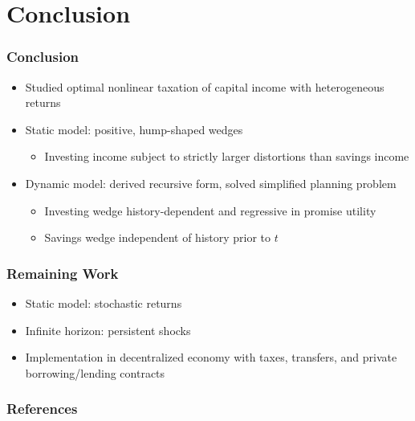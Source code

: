 \documentclass{beamer}
\begin{document}



\section{Conclusion}
\begin{frame}
    \frametitle{Conclusion}

    \begin{itemize}
        \item Studied optimal nonlinear taxation of capital income with heterogeneous returns 
        \item Static model: positive, hump-shaped wedges 
        \begin{itemize}
            \item Investing income subject to strictly larger distortions than savings income 
        \end{itemize} 
        \item Dynamic model: derived recursive form, solved simplified planning problem 
        \begin{itemize}
            \item Investing wedge history-dependent and regressive in promise utility
            \item Savings wedge independent of history prior to \( t \) 
        \end{itemize}
    \end{itemize}

\end{frame}

\begin{frame}
    \frametitle{Remaining Work}

    \begin{itemize} 
        \item Static model: stochastic returns 
        \item Infinite horizon: persistent shocks
        \item Implementation in decentralized economy with taxes, transfers, and private borrowing/lending contracts 
    \end{itemize}

\end{frame}

\begin{frame}[allowframebreaks]
    \frametitle{References}

    
    

\end{frame}
\end{document}
